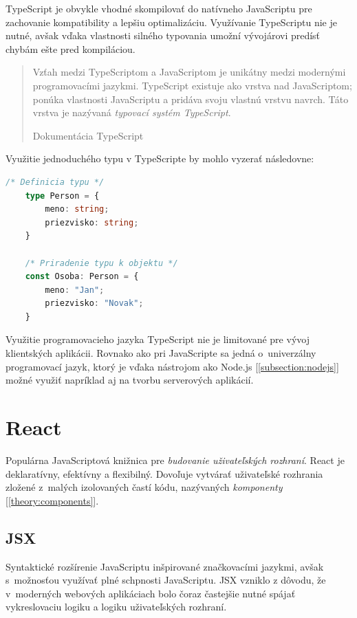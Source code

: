 TypeScript je obvykle vhodné skompilovať do natívneho JavaScriptu pre zachovanie kompatibility a lepšiu optimalizáciu. Využívanie TypeScriptu nie je nutné, avšak vďaka vlastnosti silného typovania umožní vývojárovi predísť chybám ešte pred kompiláciou.

\blockquote[Dokumentácia TypeScript \cite{TSWeb}]{Vzťah medzi TypeScriptom a JavaScriptom je unikátny medzi modernými programovacími jazykmi. TypeScript existuje ako vrstva nad JavaScriptom; ponúka vlastnosti JavaScriptu a pridáva svoju vlastnú vrstvu navrch. Táto vrstva je nazývaná \emph{typovací systém TypeScript}.}

\noindent Využitie jednoduchého typu v TypeScripte by mohlo vyzerať následovne: \\

\begin{lstlisting}[language=TypeScript, caption=Príklad zápisu v~programovacom jazyku TypeScript.]
	/* Definicia typu */
	type Person = {
		meno: string;
		priezvisko: string;
	}

	/* Priradenie typu k objektu */
	const Osoba: Person = {
		meno: "Jan";
		priezvisko: "Novak";
	}
\end{lstlisting}

\medskip

\noindent Využitie programovacieho jazyka TypeScript nie je limitované pre vývoj klientských aplikácii. Rovnako ako pri JavaScripte sa jedná o~univerzálny programovací jazyk, ktorý je vďaka nástrojom ako Node.js [\ref{subsection:nodejs}] možné využiť napríklad aj na tvorbu serverových aplikácií.

\section{React}
\label{theory:react}
Populárna JavaScriptová knižnica pre \emph{budovanie uživateľských rozhraní}. React je deklaratívny, efektívny a flexibilný. Dovoľuje vytvárať uživateľské rozhrania zložené z~malých izolovaných častí kódu, nazývaných \emph{komponenty} [\ref{theory:components}]. \cite{React}

\subsection{JSX}
Syntaktické rozšírenie JavaScriptu inšpirované značkovacími jazykmi, avšak s~možnosťou využívať plné schpnosti JavaScriptu. JSX vzniklo z dôvodu, že v~moderných webových aplikáciach bolo čoraz častejšie nutné spájať vykreslovaciu logiku a logiku uživateľských rozhraní. \cite{React} \\

